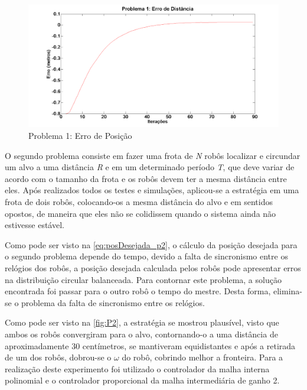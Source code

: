 \begin{figure}[!htb]
	\centering
	\includegraphics[width=.9\linewidth]{./Testes/Problema1/Incremental/ErroDistancia}
	\caption{Problema 1: Erro de Posição}
	\label{fig:P12Erro}
\end{figure}

O segundo problema consiste em fazer uma frota de \emph{N} robôs localizar e circundar um alvo a uma distância \emph{R} e em um determinado período \emph{T}, que deve variar de acordo com o tamanho da frota e os robôs devem ter a mesma distância entre eles. Após realizados todos os testes e simulações, aplicou-se a estratégia em uma frota de dois robôs, colocando-os a mesma distância do alvo e em sentidos opostos, de maneira que eles não se colidissem quando o sistema ainda não estivesse estável. 

Como pode ser visto na \autoref{eq:posDesejada_p2}, o cálculo da posição desejada para o segundo problema depende do tempo, devido a falta de sincronismo entre os relógios dos robôs, a posição desejada calculada pelos robôs pode apresentar erros na distribuição circular balanceada. Para contornar este problema, a solução encontrada foi passar para o outro robô o tempo do mestre. Desta forma, elimina-se o problema da falta de sincronismo entre os relógios. 

Como pode ser visto na \autoref{fig:P2}, a estratégia se mostrou plausível, visto que ambos os robôs convergiram para o alvo, contornando-o a uma distância de aproximadamente 30 centímetros, se mantiveram equidistantes e após a retirada de um dos robôs, %
dobrou-se o $\omega$ do robô, cobrindo melhor a fronteira. Para a realização deste experimento foi utilizado o controlador da malha interna polinomial e o controlador proporcional da malha intermediária de ganho 2.

